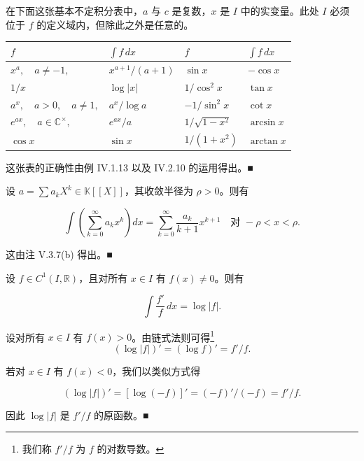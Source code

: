 \begin{example}

\begin{items}
\item

在下面这张基本不定积分表中，$ a $ 与 $ c $ 是复数，$ x $ 是 $ I $ 中的实变量。此处 $ I $ 必须位于 $ f $ 的定义域内，但除此之外是任意的。

\end{items}

\begin{center}
\begin{tabular}{llll}
\toprule
$ f $ & $ \int f \, dx $ & $ f $ & $ \int f \, dx $ \\
\midrule
$ x^{a} , \quad a \ne -1 , $ & $ x^{a+1}/(a+1) $ & $ \sin x $ & $ -\cos x $ \\
$ 1/x $ & $ \log|x| $ & $ 1/\cos^{2} x $ & $ \tan x $ \\
$ a^{x} , \quad a > 0 , \quad a \ne 1 , $ & $ a^{x}/\log a $ & $ -1/\sin^{2} x $ & $ \cot x $ \\
$ e^{ax} , \quad a \in \mathbb{C}^{\times} , $ & $ e^{ax}/a $ & $ 1/\sqrt{1-x^{2}} $ & $ \arcsin x $ \\
$ \cos x $ & $ \sin x $ & $ 1/(1+x^{2}) $ & $ \arctan x $ \\
\bottomrule
\end{tabular}
\end{center}

\proofhead
这张表的正确性由例 IV.1.13 以及 IV.2.10 的运用得出。\nobreak\hspace{0.35em}■

\begin{items}
\item[（b）]

设 $ a = \sum a_k X^k \in \mathbb{K}[[X]] $，其收敛半径为 $ \rho > 0 $。则有

\[
\int \left( \sum_{k=0}^{\infty} a_k x^k \right) dx = \sum_{k=0}^{\infty} \frac{a_k}{k+1} x^{k+1} \quad \text{对 } -\rho < x < \rho .
\]

\proofhead
这由注 V.3.7(b) 得出。\nobreak\hspace{0.35em}■
\item[（c）]

设 $ f \in C^{1}(I, \mathbb{R}) $，且对所有 $ x \in I $ 有 $ f(x) \ne 0 $。则有

\[
\int \frac{f'}{f} \, dx = \log|f| .
\]

\proofhead
设对所有 $ x \in I $ 有 $ f(x) > 0 $。由链式法则可得\footnote{我们称 $ f'/f $ 为 $ f $ 的对数导数。}
\[
(\log|f|)' = (\log f)' = f'/f .
\]

若对 $ x \in I $ 有 $ f(x) < 0 $，我们以类似方式得

\[
(\log|f|)' = [\log(-f)]' = (-f)'/(-f) = f'/f .
\]

因此 $ \log|f| $ 是 $ f'/f $ 的原函数。\nobreak\hspace{0.35em}■

\end{items}

\end{example}

